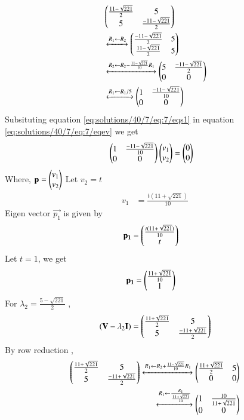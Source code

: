 \begin{align}
    &\begin{pmatrix}\frac{11-\sqrt{221}}{2} & 5 \\5 & \frac{-11-\sqrt{221}}{2}\end{pmatrix}\\
    &\xleftrightarrow{R_1\leftarrow R_2}
    \begin{pmatrix}\frac{-11-\sqrt{221}}{2} & 5 \\ \frac{11-\sqrt{221}}{2} & 5\end{pmatrix}\\
 &\xleftrightarrow{R_2\leftarrow R_2-\frac{11-\sqrt{221}}{10}R_{1}}
    \begin{pmatrix}5 & \frac{-11-\sqrt{221}}{2} \\ 0& 0\end{pmatrix}\\
     &\xleftrightarrow{R_1\leftarrow R_1/5}
    \begin{pmatrix}1 & \frac{-11-\sqrt{221}}{10} \\ 0& 0\end{pmatrix}
    \label{eq:solutions/40/7/eq:7/eqs1}
\end{align}
Subsituting equation \ref{eq:solutions/40/7/eq:7/eqs1} in equation \ref{eq:solutions/40/7/eq:7/eqev} we get
\begin{align}
        & \begin{pmatrix}1 & \frac{-11-\sqrt{221}}{10} \\ 0& 0\end{pmatrix}\begin{pmatrix}v_1 \\ v_2\end{pmatrix}=\begin{pmatrix}0 \\ 0\end{pmatrix}\label{eq:solutions/40/7/eq:7/eqei1}
\end{align}
Where, $\mathbf{p}=\begin{pmatrix}v_1\\v_2\end{pmatrix}$
Let $v_2=t$
\begin{align}
    v_1&=\frac{t(11+\sqrt{221})}{10}
\end{align}
Eigen vector $\vec{p_1}$ is given by
\begin{align}
    \mathbf{p_1}&=\begin{pmatrix}\frac{t(11+\sqrt{221})}{10} \\ t\end{pmatrix}
\end{align}
Let $t=1$, we get
\begin{align}
        \mathbf{p_1}&=\begin{pmatrix}\frac{11+\sqrt{221}}{10} \\1 \end{pmatrix}\label{eq:solutions/40/7/eq:es71/eqp1}
\end{align}
For $\lambda_2=\frac{5-\sqrt{221}}{2}$ ,
\begin{align}
    (\mathbf{V}-\lambda_2\mathbf{I})=\begin{pmatrix}\frac{11+\sqrt{221}}{2} & 5 \\5 & \frac{-11+\sqrt{221}}{2}\end{pmatrix}
\end{align}
By row reduction , 
\begin{align}
     \begin{pmatrix}\frac{11+\sqrt{221}}{2} & 5 \\5 & \frac{-11+\sqrt{221}}{2}\end{pmatrix}
    \xleftrightarrow{R_1\leftarrow R_2+ \frac{11-\sqrt{221}}{10}R_1}
     \begin{pmatrix}\frac{11+\sqrt{221}}{2} &5\\ 0& 0\end{pmatrix}\\  
 \xleftrightarrow{R_1\leftarrow
 \frac{R_1}{\frac{11+\sqrt{221}}{10}}}
    \begin{pmatrix}1 & \frac{10}{11+\sqrt{221}} \\ 0& 0\end{pmatrix}
    \label{eq:solutions/40/7/eq:es71/eqs2}
\end{align} 
